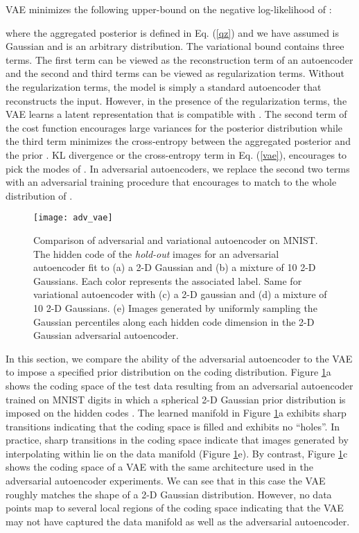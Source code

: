\documentclass{article}
\begin{document}
VAE \citep{vae} minimizes the following upper-bound on the negative log-likelihood of :



where the aggregated posterior  is defined in Eq. (\ref{qz}) and we have assumed  is Gaussian and  is an arbitrary distribution.
The variational bound contains three terms.
The first term can be viewed as the reconstruction term of an autoencoder and the second and third terms can be viewed as regularization terms.
Without the regularization terms, the model is simply a standard autoencoder that reconstructs the input.
However, in the presence of the regularization terms, the VAE learns a latent representation that is compatible with .
The second term of the cost function encourages large variances for the posterior distribution while the third term minimizes the cross-entropy between the aggregated posterior  and the prior . 
KL divergence or the cross-entropy term in Eq. (\ref{vae}), encourages  to pick the modes of . In adversarial autoencoders, we replace the second two terms with an adversarial training procedure that encourages  to match to the whole distribution of .




\begin{figure}[t]
\centering\texttt{[image: adv\_vae]}
\caption{\label{fig_mnist}Comparison of adversarial and variational autoencoder on MNIST. The hidden code  of the \emph{hold-out} images for an adversarial autoencoder fit to (a) a 2-D Gaussian and (b) a mixture of 10 2-D Gaussians. Each color represents the associated label. Same for variational autoencoder with (c) a 2-D gaussian and (d) a mixture of 10 2-D Gaussians. (e) Images generated by uniformly sampling the Gaussian percentiles along each hidden code dimension  in the 2-D Gaussian adversarial autoencoder.}
\end{figure}

In this section, we compare the ability of the adversarial autoencoder to the VAE to impose a specified prior distribution  on the coding distribution.
Figure \ref{fig_mnist}a shows the coding space  of the test data resulting from an adversarial autoencoder trained on MNIST digits in which a
spherical 2-D Gaussian prior distribution is imposed on the hidden codes .
The learned manifold in Figure \ref{fig_mnist}a exhibits sharp transitions indicating that the coding space is filled and exhibits no ``holes''.
In practice, sharp transitions in the coding space indicate that images generated by interpolating within  lie on the data manifold (Figure \ref{fig_mnist}e).
By contrast, Figure \ref{fig_mnist}c shows the coding space of a VAE with the same architecture used in the adversarial autoencoder experiments.
We can see that in this case the VAE roughly matches the shape of a 2-D Gaussian distribution.
However, no data points map to several local regions of the coding space indicating that the VAE may not have captured the data manifold
as well as the adversarial autoencoder.
\end{document}
